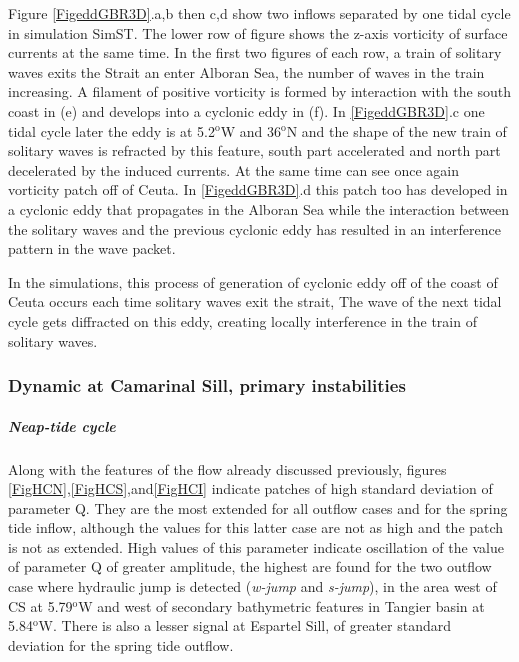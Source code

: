 Figure \ref{FigeddGBR3D}.a,b then c,d show two inflows separated by one tidal cycle in simulation SimST. The lower row of figure shows the z-axis vorticity of surface currents at the same time. In the first two figures of each row, a train of solitary waves exits the Strait an enter Alboran Sea, the number of waves in the train increasing. A filament of positive vorticity is formed by interaction with the south coast in (e) and develops into a cyclonic eddy in (f). In \ref{FigeddGBR3D}.c one tidal cycle later the eddy is at 5.2$^\text{o}$W and 36$^\text{o}$N and the shape of the new train of solitary waves is refracted by this feature, south part accelerated and north part decelerated by the induced currents. At the same time can see once again vorticity patch off of Ceuta. In \ref{FigeddGBR3D}.d this patch too has developed in a cyclonic eddy that propagates in the Alboran Sea while the interaction between the solitary waves and the previous cyclonic eddy has resulted in an interference pattern in the wave packet. 


In the simulations, this process of generation of cyclonic eddy off of the coast of Ceuta occurs each time solitary waves exit the strait,  The wave of the next tidal cycle gets diffracted on this eddy, creating locally interference in the train of solitary waves.



\subsubsection{Dynamic at Camarinal Sill, primary instabilities}

\subparagraph{Neap-tide cycle}

Along with the features of the flow already discussed previously, figures \ref{FigHCN},\ref{FigHCS},and\ref{FigHCI} indicate patches of high standard deviation of parameter Q. They are the most extended for all outflow cases and for the spring tide inflow, although the values for this latter case are not as high and the patch is not as extended. High values of this parameter indicate oscillation of the value of parameter Q of greater amplitude, the highest are found for the two outflow case where hydraulic jump is detected (\textit{w-jump} and \textit{s-jump}), in the area west of CS at 5.79$^\text{o}$W and west of secondary bathymetric features in Tangier basin at 5.84$^\text{o}$W. There is also a lesser signal at Espartel Sill, of greater standard deviation for the spring tide outflow.

